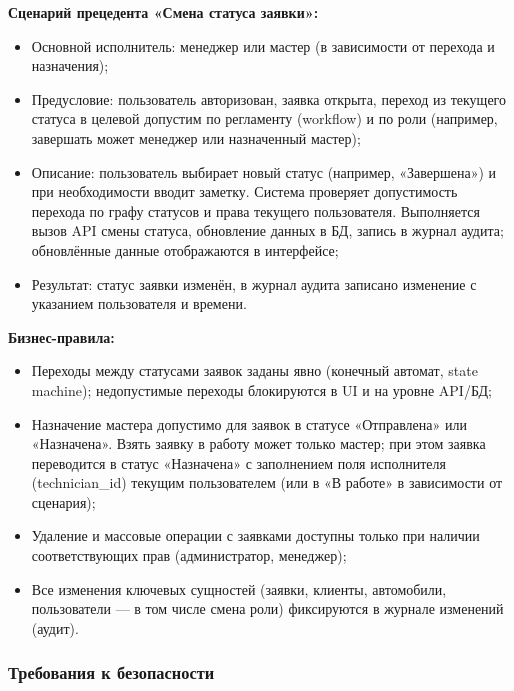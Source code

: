 \textbf{Сценарий прецедента «Смена статуса заявки»:}

\begin{itemize}
	\item Основной исполнитель: менеджер или мастер (в зависимости от перехода и назначения);
	\item Предусловие: пользователь авторизован, заявка открыта, переход из текущего статуса в целевой допустим по регламенту (workflow) и по роли (например, завершать может менеджер или назначенный мастер);
	\item Описание: пользователь выбирает новый статус (например, «Завершена») и при необходимости вводит заметку. Система проверяет допустимость перехода по графу статусов и права текущего пользователя. Выполняется вызов API смены статуса, обновление данных в БД, запись в журнал аудита; обновлённые данные отображаются в интерфейсе; 
	\item Результат: статус заявки изменён, в журнал аудита записано изменение с указанием пользователя и времени. 
\end{itemize}

\textbf{Бизнес-правила:}

\begin{itemize}
	\item Переходы между статусами заявок заданы явно (конечный автомат, state machine); недопустимые переходы блокируются в UI и на уровне API/БД;
	\item Назначение мастера допустимо для заявок в статусе «Отправлена» или «Назначена». Взять заявку в работу может только мастер; при этом заявка переводится в статус «Назначена» с заполнением поля исполнителя (technician\_id) текущим пользователем (или в «В работе» в зависимости от сценария);
	\item Удаление и массовые операции с заявками доступны только при наличии соответствующих прав (администратор, менеджер);
	\item Все изменения ключевых сущностей (заявки, клиенты, автомобили, пользователи — в том числе смена роли) фиксируются в журнале изменений (аудит).
\end{itemize}

\subsubsection{Требования к безопасности}

